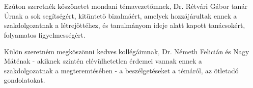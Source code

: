 \chapter*{\koszonetnyilvanitas}

Ezúton szeretnék köszönetet mondani témavezetőmnek, Dr. Rétvári Gábor tanár Úrnak a sok
segítségért, kitüntető bizalmáért, amelyek hozzájárultak ennek a szakdolgozatnak a
létrejöttéhez, és tanulmányom ideje alatt kapott tanácsokért, folyamatos figyelmességért.

Külön szeretném megköszönni kedves kollégáimnak, Dr. Németh Felicián és Nagy Máténak - 
akiknek szintén elévülhetetlen érdemei vannak ennek a szakdolgozatnak a megteremtésében - a
beszélgetéseket a témáról, az ötletadó gondolatokat.